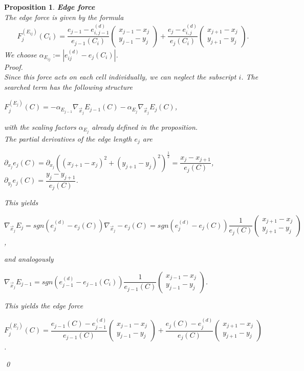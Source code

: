 \documentclass[a4paper,12pt,leqno]{article}
\theoremstyle{plain}
\newtheorem{proposition}[theorem]{Proposition}
\theoremstyle{remark}
\begin{document}
\begin{proposition} \textbf{Edge force} \\
	The edge force is given by the formula
	\begin{align}
		F^{(E_{ij})}_j(C_i) = \dfrac{e_{j-1} - e_{i, j-1}^{(d)}}{e_{j-1}(C_i) } \begin{pmatrix} x_{j-1} - x_j \\ y_{j-1} - y_j\end{pmatrix} + 
		\dfrac{e_{j} - e_{i, j}^{(d)}}{e_{j}(C_i)} \begin{pmatrix} x_{j+1} - x_j \\ y_{j+1} - y_j\end{pmatrix}.
	\end{align}
	We choose $\alpha_{E_{ij}} := | e_{ij}^{(d)} - e_j(C_i) |$. \\
	Proof. \\
	Since this force acts on each cell individually, we can neglect the subscript $i$.
	The searched term has the following structure
	\begin{center}
		$F^{(E_{j})}_j(C) = - \alpha_{E_{j-1}} \nabla_{\vec{x}_j} E_{j-1}(C) - \alpha_{E_{j}} \nabla_{\vec{x}_j} E_{j}(C)$,
	\end{center}
	with the scaling factors $\alpha_{E_j}$ already defined in the proposition. \\	
	The partial derivatives of the edge length $e_j$ are
	\begin{center}
		$\partial_{x_j} e_j(C) = \partial_{x_j} ( (x_{j+1}- x_j)^2 + (y_{j+1} - y_j)^2)^{\frac{1}{2}} = \dfrac{ x_j - x_{j+1} }{ e_j(C) }$, \\
		$\partial_{y_j} e_j(C) = \dfrac{ y_j - y_{j+1} }{ e_j(C) }$. \\
	\end{center}
	This yields
	\begin{center}
		$ \nabla_{\vec{x}_j} E_{j} = sgn(e_{j}^{(d)} - e_j(C)) \nabla_{\vec{x}_j} - e_j(C)  = sgn(e_{j}^{(d)} - e_j(C))  \dfrac{1}{  e_j(C) } \begin{pmatrix} x_{j+1} - x_j \\ 	y_{j+1} - y_j \end{pmatrix}$,
	\end{center}
	and analogously
	\begin{center}
		$\nabla_{\vec{x}_j} E_{j-1} = sgn(e_{j-1}^{(d)} - e_{j-1}(C_i))  \dfrac{1}{  e_{j-1}(C) } \begin{pmatrix} x_{j-1} - x_j \\ 	y_{j-1} - y_j \end{pmatrix}$. 
	\end{center}
	This yields the edge force 
	\begin{center}
		$F_j^{(E_{j})}(C) = \dfrac{e_{j-1}(C) - e_{j-1}^{(d)}}{e_{j-1}(C)} 
		\begin{pmatrix}  x_{j-1} - x_j \\ y_{j-1} - y_j  \end{pmatrix} + 
		\dfrac{e_{j}(C) - e_{j}^{(d)}}{e_{j}(C)} 
		\begin{pmatrix}  x_{j+1} - x_j \\ y_{j+1} - y_j  \end{pmatrix}$.
	\end{center}
	\qed  
\end{proposition}
\end{document}
